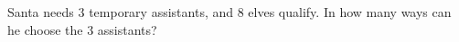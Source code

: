 Santa needs $3$ temporary assistants, and $8$ elves qualify. In how many ways can he choose the $3$ assistants?
